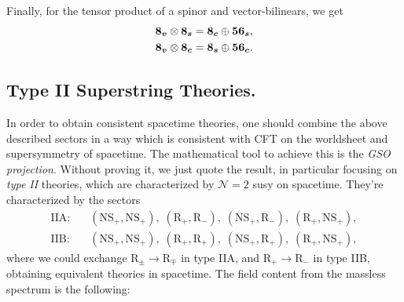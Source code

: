 Finally, for the tensor product of a spinor and vector-bilinears, we get
\begin{subequations}
\begin{align}
    \boldsymbol{8_v} \otimes \boldsymbol{8_s} = \boldsymbol{8_c} \oplus \boldsymbol{56_s} ,\\
    \boldsymbol{8_v} \otimes \boldsymbol{8_c} = \boldsymbol{8_s} \oplus \boldsymbol{56_c} .
\end{align}
\end{subequations}
 
\subsection{Type II Superstring Theories.}
In order to obtain consistent spacetime theories, one should combine the above described sectors in a way which is consistent with CFT on the worldsheet and supersymmetry of spacetime. The mathematical tool to achieve this is the \emph{GSO projection}. Without proving it, we just quote the result, in particular focusing on \emph{type II} theories, which are characterized by $\mathcal{N} = 2$ susy on spacetime. They're characterized by the sectors
\begin{equation}\label{eq:type-ii-sectors}
\begin{aligned}
   \text{IIA}: \quad &(\text{NS}_+, \text{NS}_+),\; (\text{R}_+, \text{R}_-), \;(\text{NS}_+,\text{R}_-),\; (\text{R}_+, \text{NS}_+) , \\
   \text{IIB}: \quad &(\text{NS}_+, \text{NS}_+), \;(\text{R}_+, \text{R}_+), \;(\text{NS}_+,\text{R}_+), \;(\text{R}_+, \text{NS}_+),
\end{aligned}
\end{equation}
where we could exchange $\text{R}_\pm \to \text{R}_\mp$ in type IIA, and $\text{R}_+\to \text{R}_-$ in type IIB, obtaining equivalent theories in spacetime. The field content from the massless spectrum is the following:
\begin{equation*}
    
\end{equation*}

